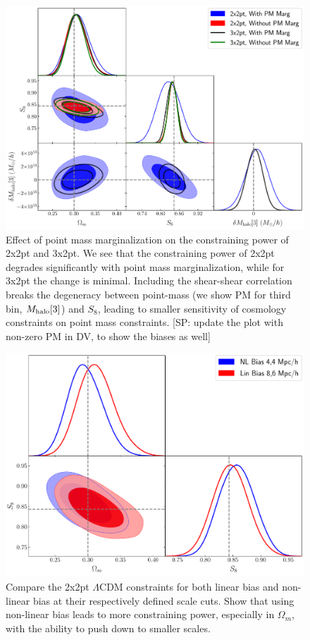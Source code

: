 \documentclass[fleqn,usenatbib]{mnras}
\newcommand{\SP}[1]{{\color{red}[SP: #1]}}
\begin{document}
\begin{figure}
\includegraphics[width=\columnwidth]{figs/PM_constraints_2x2pt_3x2pt.pdf}
\caption[]{Effect of point mass marginalization on the constraining power of 2x2pt and 3x2pt. We see that the constraining power of 2x2pt degrades significantly with point mass marginalization, while for 3x2pt the change is minimal. Including the shear-shear correlation  breaks the degeneracy between point-mass (we show PM for third bin, $M_{\rm halo}[3]$) and $S_8$, leading to smaller sensitivity of cosmology constraints on point mass constraints. \SP{update the plot with non-zero PM in DV, to show the biases as well} }
\label{fig:pm_effect}
\end{figure}

\begin{figure}
\includegraphics[width=\columnwidth]{figs/compare_cosmo_nl44_lin86.pdf}
\caption[]{Compare the 2x2pt $\Lambda$CDM constraints for both linear bias and non-linear bias at their respectively defined scale cuts. Show that using non-linear bias leads to more constraining power, especially in $\Omega_m$, with the ability to push down to smaller scales. }
\label{fig:des_comp}
\end{figure}
\end{document}
